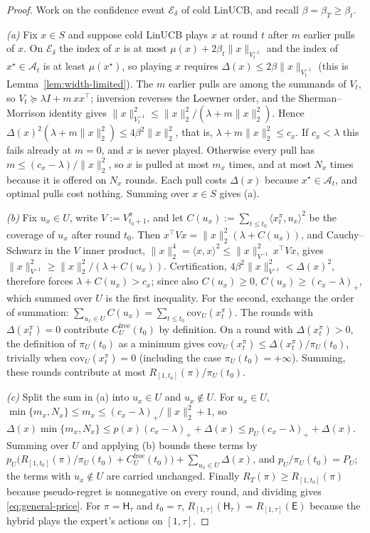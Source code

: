 \documentclass{article}
\theoremstyle{definition}
\theoremstyle{remark}
\theoremstyle{remark}
\newcommand{\Exp}{\mathsf{E}}
\newcommand{\Hyb}{\mathsf{H}}
\begin{document}
\begin{proof}
Work on the confidence event $\mathcal E_\delta$ of cold LinUCB, and recall
$\beta=\beta_T\ge\beta_t$.

\emph{(a)} Fix $x\in S$ and suppose cold LinUCB plays $x$ at round $t$ after
$m$ earlier pulls of $x$. On $\mathcal E_\delta$ the index of $x$ is at most
$\mu(x)+2\beta_t\|x\|_{V_t^{-1}}$ and the index of $x^\star\in\mathcal A_t$
is at least $\mu(x^\star)$, so playing $x$ requires
$\Delta(x)\le2\beta\|x\|_{V_t^{-1}}$ (this is Lemma~\ref{lem:width-limited}).
The $m$ earlier pulls are among the summands of $V_t$, so
$V_t\succeq\lambda I+m\,xx^\top$; inversion reverses the Loewner order, and
the Sherman--Morrison identity gives
$\|x\|^2_{V_t^{-1}}\le\|x\|_2^2/(\lambda+m\|x\|_2^2)$. Hence
$\Delta(x)^2(\lambda+m\|x\|_2^2)\le4\beta^2\|x\|_2^2$, that is,
$\lambda+m\|x\|_2^2\le c_x$. If $c_x<\lambda$ this fails already at $m=0$, and
$x$ is never played. Otherwise every pull has
$m\le(c_x-\lambda)/\|x\|_2^2$, so $x$ is pulled at most $m_x$ times, and at
most $N_x$ times because it is offered on $N_x$ rounds. Each pull costs
$\Delta(x)$ because $x^\star\in\mathcal A_t$, and optimal pulls cost nothing.
Summing over $x\in S$ gives (a).

\emph{(b)} Fix $u_x\in U$, write $V:=V^\pi_{t_0+1}$, and let
$C(u_x):=\sum_{t\le t_0}\langle x^\pi_t,u_x\rangle^2$ be the coverage of $u_x$
after round $t_0$. Then $x^\top Vx=\|x\|_2^2(\lambda+C(u_x))$, and
Cauchy--Schwarz in the $V$ inner product,
$\|x\|_2^4=\langle x,x\rangle^2\le\|x\|^2_{V^{-1}}\,x^\top Vx$, gives
$\|x\|^2_{V^{-1}}\ge\|x\|_2^2/(\lambda+C(u_x))$. Certification,
$4\beta^2\|x\|^2_{V^{-1}}<\Delta(x)^2$, therefore forces
$\lambda+C(u_x)>c_x$; since also $C(u_x)\ge0$, $C(u_x)\ge(c_x-\lambda)_+$,
which summed over $U$ is the first inequality. For the second, exchange the
order of summation: $\sum_{u_x\in U}C(u_x)=\sum_{t\le t_0}\mathrm{cov}_U(x^\pi_t)$.
The rounds with $\Delta(x^\pi_t)=0$ contribute $C^{\mathrm{free}}_U(t_0)$ by
definition. On a round with $\Delta(x^\pi_t)>0$, the definition of
$\pi_U(t_0)$ as a minimum gives
$\mathrm{cov}_U(x^\pi_t)\le\Delta(x^\pi_t)/\pi_U(t_0)$, trivially when
$\mathrm{cov}_U(x^\pi_t)=0$ (including the case $\pi_U(t_0)=+\infty$).
Summing, these rounds contribute at most $R_{[1,t_0]}(\pi)/\pi_U(t_0)$.

\emph{(c)} Split the sum in (a) into $u_x\in U$ and $u_x\notin U$. For
$u_x\in U$, $\min\{m_x,N_x\}\le m_x\le(c_x-\lambda)_+/\|x\|_2^2+1$, so
$\Delta(x)\min\{m_x,N_x\}\le p(x)(c_x-\lambda)_++\Delta(x)\le p_U(c_x-\lambda)_++\Delta(x)$.
Summing over $U$ and applying (b) bounds these terms by
$p_U\bigl(R_{[1,t_0]}(\pi)/\pi_U(t_0)+C^{\mathrm{free}}_U(t_0)\bigr)+\sum_{u_x\in U}\Delta(x)$,
and $p_U/\pi_U(t_0)=P_U$; the terms with $u_x\notin U$ are carried unchanged.
Finally $R_T(\pi)\ge R_{[1,t_0]}(\pi)$ because pseudo-regret is nonnegative on
every round, and dividing gives \eqref{eq:general-price}. For $\pi=\Hyb_\tau$
and $t_0=\tau$, $R_{[1,\tau]}(\Hyb_\tau)=R_{[1,\tau]}(\Exp)$ because the
hybrid plays the expert's actions on $[1,\tau]$.
\end{proof}
\end{document}
